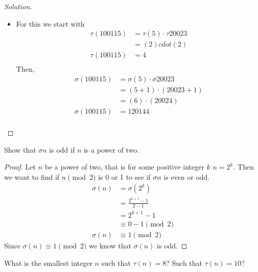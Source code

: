 \documentclass[11pt]{article}
\newenvironment{problem}[2][Problem]{\begin{trivlist}
\item[\hskip \labelsep {\bfseries #1}\hskip \labelsep {\bfseries #2.}]}{\end{trivlist}}
\newenvironment{solution}
  {\renewcommand\qedsymbol{$~$}\begin{proof}[Solution]$ $\par\nobreak\ignorespaces}
  {\end{proof}}
\begin{document}
\begin{solution}
\begin{itemize}
        \item[100115] For this we start with
              \begin{align*}
                  \tau(100115) & = \tau(5) \cdot \tau{20023} \\
                               & = (2) cdot (2)              \\
                  \tau(100115) & = 4                         \\
              \end{align*}
              Then,
              \begin{align*}
                  \sigma(100115) & = \sigma(5) \cdot \sigma{20023} \\
                                 & = (5+1) \cdot (20023+1)         \\
                                 & = (6) \cdot (20024)             \\
                  \sigma(100115) & = 120144                        \\
              \end{align*}
    \end{itemize}
\end{solution}



\begin{problem}{5}
Show that $\sigma{n}$ is odd if $n$ is a power of two.
\end{problem}

\begin{proof}
    Let $n$ be a power of two, that is for some positive integer $k$ $n=2^k$. Then we want to find if $n \pmod{2}$ is 0 or 1 to see if $\sigma{n}$ is even or odd.
    \begin{align*}
        \sigma(n) & = \sigma(2^k)           \\
                  & = \frac{2^{k+1}-1}{2-1} \\
                  & = 2^{k+1}-1             \\
                  & \equiv 0 -1 \pmod{2}    \\
        \sigma(n) & \equiv 1 \pmod{2}
    \end{align*}
    Since $\sigma(n) \equiv 1 \pmod{2}$ we know that $\sigma(n)$ is odd.
\end{proof}



\begin{problem}{7}
What is the smallest integer $n$ such that $\tau(n)=8$? Such that $\tau(n)=10$?
\end{problem}
\end{document}
